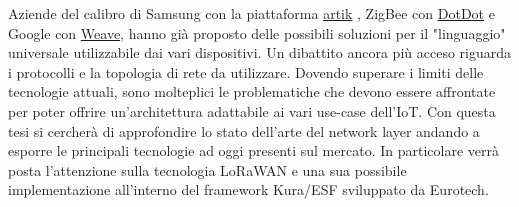 Aziende del calibro di Samsung con la
piattaforma \href{https://www.artik.io}{artik}  , ZigBee con
\href{https://www.speakdotdot.com/dotdot/}{DotDot} e Google con
\href{https://developers.nest.com/weave/}{Weave}, hanno già proposto delle
possibili soluzioni per il "linguaggio" universale utilizzabile dai vari
dispositivi. Un dibattito ancora più acceso  riguarda i protocolli e la topologia di
rete da utilizzare. Dovendo superare i limiti delle tecnologie attuali, sono
molteplici le problematiche che devono essere affrontate per poter offrire un'architettura 
adattabile ai vari use-case dell'IoT.
Con questa tesi si cercherà di  approfondire lo stato dell'arte del network layer
andando a esporre le principali tecnologie ad oggi presenti sul mercato. In
particolare verrà posta l'attenzione sulla tecnologia LoRaWAN e una sua possibile
implementazione all'interno del framework Kura/ESF sviluppato da Eurotech.



